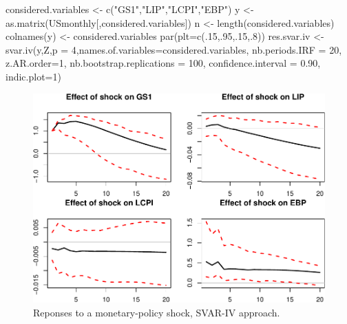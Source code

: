 \documentclass[
  12pt,
]{book}
\newenvironment{Shaded}{\begin{snugshade}}{\end{snugshade}}
\newcommand{\AttributeTok}[1]{\textcolor[rgb]{0.77,0.63,0.00}{#1}}
\newcommand{\DecValTok}[1]{\textcolor[rgb]{0.00,0.00,0.81}{#1}}
\newcommand{\FloatTok}[1]{\textcolor[rgb]{0.00,0.00,0.81}{#1}}
\newcommand{\FunctionTok}[1]{\textcolor[rgb]{0.00,0.00,0.00}{#1}}
\newcommand{\NormalTok}[1]{#1}
\newcommand{\OtherTok}[1]{\textcolor[rgb]{0.56,0.35,0.01}{#1}}
\newcommand{\StringTok}[1]{\textcolor[rgb]{0.31,0.60,0.02}{#1}}
\theoremstyle{definition}
\theoremstyle{definition}
\theoremstyle{definition}
\theoremstyle{definition}
\theoremstyle{remark}
\begin{document}
\begin{Shaded}
\begin{Highlighting}[]
\NormalTok{considered.variables }\OtherTok{\textless{}{-}} \FunctionTok{c}\NormalTok{(}\StringTok{"GS1"}\NormalTok{,}\StringTok{"LIP"}\NormalTok{,}\StringTok{"LCPI"}\NormalTok{,}\StringTok{"EBP"}\NormalTok{)}
\NormalTok{y }\OtherTok{\textless{}{-}} \FunctionTok{as.matrix}\NormalTok{(USmonthly[,considered.variables])}
\NormalTok{n }\OtherTok{\textless{}{-}} \FunctionTok{length}\NormalTok{(considered.variables)}
\FunctionTok{colnames}\NormalTok{(y) }\OtherTok{\textless{}{-}}\NormalTok{ considered.variables}
\FunctionTok{par}\NormalTok{(}\AttributeTok{plt=}\FunctionTok{c}\NormalTok{(.}\DecValTok{15}\NormalTok{,.}\DecValTok{95}\NormalTok{,.}\DecValTok{15}\NormalTok{,.}\DecValTok{8}\NormalTok{))}
\NormalTok{res.svar.iv }\OtherTok{\textless{}{-}} 
  \FunctionTok{svar.iv}\NormalTok{(y,Z,}\AttributeTok{p =} \DecValTok{4}\NormalTok{,}\AttributeTok{names.of.variables=}\NormalTok{considered.variables,}
          \AttributeTok{nb.periods.IRF =} \DecValTok{20}\NormalTok{,}
          \AttributeTok{z.AR.order=}\DecValTok{1}\NormalTok{, }
          \AttributeTok{nb.bootstrap.replications =} \DecValTok{100}\NormalTok{, }
          \AttributeTok{confidence.interval =} \FloatTok{0.90}\NormalTok{,}
          \AttributeTok{indic.plot=}\DecValTok{1}\NormalTok{)}
\end{Highlighting}
\end{Shaded}

\begin{figure}
\includegraphics[width=0.95\linewidth]{IdentifStructShocks_files/figure-latex/essaiIV1-1} \caption{Reponses to a monetary-policy shock, SVAR-IV approach.}\label{fig:essaiIV1}
\end{figure}
\end{document}
